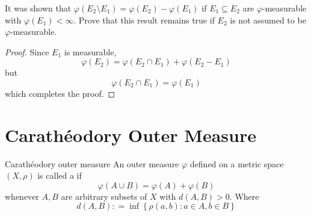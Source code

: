 \documentclass[../main.tex]{subfiles}
\begin{document}
\begin{exercise}{}{}
    It was shown that \(   \varphi \left( E_2\setminus E_1 \right)=  \varphi  \left( E_2 \right)- \varphi \left( E_1 \right)     \) if \(  E_1\subseteq E_2  \) are \(   \varphi   \)-measurable with \(   \varphi \left( E_1 \right)< \infty   \). Prove that this result remains true if \(  E_2  \) is not assumed to be \(   \varphi   \)-measurable.      
\end{exercise}
\begin{proof}
   Since \(  E_1  \) is measurable,    \[
      \varphi \left( E_2 \right)=  \varphi \left( E_2\cap E_1 \right)+  \varphi \left( E_2-E_1 \right)   
     \] but \[
      \varphi \left( E_2\cap E_1 \right)=  \varphi \left( E_1 \right)  
     \]which completes the proof. 
\end{proof}

\section{Carath\'eodory Outer Measure}

\begin{definition}{Carath\'eodory outer measure}{}
    An outer measure \(   \varphi  \) defined on a metric space \(  \left( X,\rho  \right)   \) is called a  if \[
     \varphi \left( A\cup B \right)=  \varphi \left( A \right)+  \varphi \left( B \right)   
    \] whenever \(  A,B  \) are arbitrary subsets of \(  X  \) with \(  d\left( A,B \right)> 0   \). Where \[
    d\left( A,B \right): = \inf \left\{ \rho \left( a,b \right): a \in A, b\in B  \right\} 
    \]     
\end{definition}
\end{document}
